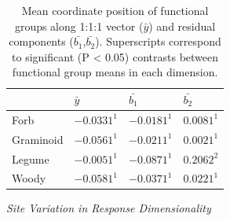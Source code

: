 \documentclass[twoside,12pt,final]{ucthesis-CA2012}
\begin{document}
\begin{ucmainmatter}
\begin{figure}
\end{figure}
\begin{table}[ht]
\centering
\begin{tabular}{llll}
  \hline
 & $\bar{y}$ & $\bar{b_1}$ & $\bar{b_2}$ \\ 
  \hline
Forb & $-0.0331^1$ & $-0.0181^1$ & $0.0081^1$ \\ 
  Graminoid & $-0.0561^1$ & $-0.0211^1$ & $0.0021^1$ \\ 
  Legume & $-0.0051^1$ & $-0.0871^1$ & $0.2062^2$ \\ 
  Woody & $-0.0581^1$ & $-0.0371^1$ & $0.0221^1$ \\ 
   \hline
\end{tabular}
\caption{Mean coordinate position of functional groups along 1:1:1 vector ($\bar{y}$) and residual components ($\bar{b_1}$,$\bar{b_2}$). Superscripts correspond to significant (P < 0.05) contrasts between functional group means in each dimension.} 
\end{table}
\newline

\emph{Site Variation in Response Dimensionality}


\end{ucmainmatter}
\end{document}
